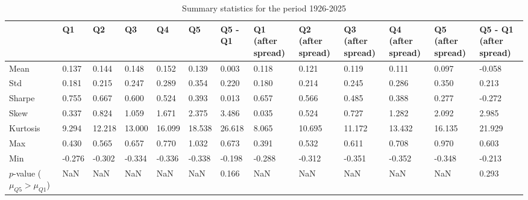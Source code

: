 \begin{table}
\caption{Summary statistics for the period 1926-2025}
\label{tab:summary_1926_2025}
\begin{tabular}{lllllllllllll}
\toprule
 & Q1 & Q2 & Q3 & Q4 & Q5 & Q5 - Q1 & Q1 (after spread) & Q2 (after spread) & Q3 (after spread) & Q4 (after spread) & Q5 (after spread) & Q5 - Q1 (after spread) \\
\midrule
Mean & 0.137 & 0.144 & 0.148 & 0.152 & 0.139 & 0.003 & 0.118 & 0.121 & 0.119 & 0.111 & 0.097 & -0.058 \\
Std & 0.181 & 0.215 & 0.247 & 0.289 & 0.354 & 0.220 & 0.180 & 0.214 & 0.245 & 0.286 & 0.350 & 0.213 \\
Sharpe & 0.755 & 0.667 & 0.600 & 0.524 & 0.393 & 0.013 & 0.657 & 0.566 & 0.485 & 0.388 & 0.277 & -0.272 \\
Skew & 0.337 & 0.824 & 1.059 & 1.671 & 2.375 & 3.486 & 0.035 & 0.524 & 0.727 & 1.282 & 2.092 & 2.985 \\
Kurtosis & 9.294 & 12.218 & 13.000 & 16.099 & 18.538 & 26.618 & 8.065 & 10.695 & 11.172 & 13.432 & 16.135 & 21.929 \\
Max & 0.430 & 0.565 & 0.657 & 0.770 & 1.032 & 0.673 & 0.391 & 0.532 & 0.611 & 0.708 & 0.970 & 0.603 \\
Min & -0.276 & -0.302 & -0.334 & -0.336 & -0.338 & -0.198 & -0.288 & -0.312 & -0.351 & -0.352 & -0.348 & -0.213 \\
$p$-value ($\mu_{Q5} > \mu_{Q1}$) & NaN & NaN & NaN & NaN & NaN & 0.166 & NaN & NaN & NaN & NaN & NaN & 0.293 \\
\bottomrule
\end{tabular}
\end{table}
